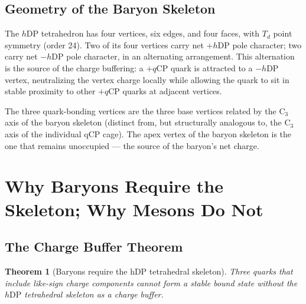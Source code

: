 \documentclass[12pt]{article}
\newtheorem{theorem}{Theorem}[section]
\newcommand{\qCP}{q\mathrm{CP}}
\newcommand{\hDP}{h\mathrm{DP}}
\begin{document}
\subsection{Geometry of the Baryon Skeleton}

The $\hDP$ tetrahedron has four vertices, six edges, and four faces,
with $T_d$ point symmetry (order 24).  Two of its four vertices carry
net $+\hDP$ pole character; two carry net $-\hDP$ pole character,
in an alternating arrangement.  This alternation is the source of
the charge buffering: a $+\qCP$ quark is attracted to a $-\hDP$
vertex, neutralizing the vertex charge locally while allowing the
quark to sit in stable proximity to other $+\qCP$ quarks at adjacent
vertices.

The three quark-bonding vertices are the three base vertices related
by the C$_3$ axis of the baryon skeleton (distinct from, but
structurally analogous to, the C$_3$ axis of the individual qCP
cage).  The apex vertex of the baryon skeleton is the one that
remains unoccupied --- the source of the baryon's net charge.

\section{Why Baryons Require the Skeleton; Why Mesons Do Not}
\label{sec:buffer}

\subsection{The Charge Buffer Theorem}

\begin{theorem}[Baryons require the hDP tetrahedral skeleton]
\label{thm:buffer}
Three quarks that include like-sign charge components cannot form
a stable bound state without the $\hDP$ tetrahedral skeleton as a
charge buffer.
\end{theorem}
\end{document}
